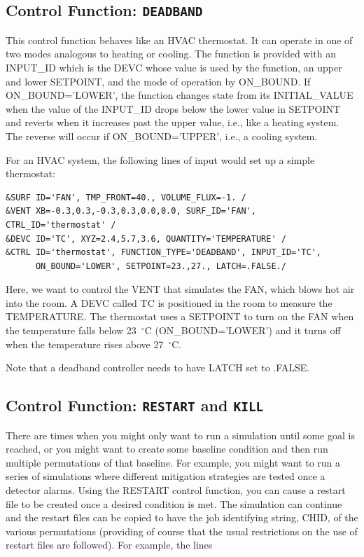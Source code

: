 \documentclass[11pt]{book}
\begin{document}
\subsection{Control Function: \texorpdfstring{{\tt DEADBAND}}{DEADBAND}}
\label{info:DEADBAND}

This control function behaves like an HVAC thermostat.  It can operate in one of two modes analogous to heating or cooling.
The function is provided with an {\ct INPUT\_ID} which is the {\ct DEVC} whose value is used by the function,
an upper and lower {\ct SETPOINT}, and the mode of operation by {\ct ON\_BOUND}.  If  {\ct ON\_BOUND='LOWER'},
the function changes state from its {\ct INITIAL\_VALUE} when the value of the {\ct INPUT\_ID} drops
below the lower value in {\ct SETPOINT} and reverts when it increases past the upper value, i.e., like a heating system.
The reverse will occur if {\ct ON\_BOUND='UPPER'}, i.e., a cooling system.

For an HVAC system, the following lines of input would set up a simple thermostat:

\begin{lstlisting}
&SURF ID='FAN', TMP_FRONT=40., VOLUME_FLUX=-1. /
&VENT XB=-0.3,0.3,-0.3,0.3,0.0,0.0, SURF_ID='FAN', CTRL_ID='thermostat' /
&DEVC ID='TC', XYZ=2.4,5.7,3.6, QUANTITY='TEMPERATURE' /
&CTRL ID='thermostat', FUNCTION_TYPE='DEADBAND', INPUT_ID='TC',
      ON_BOUND='LOWER', SETPOINT=23.,27., LATCH=.FALSE./
\end{lstlisting}

\noindent
Here, we want to control the {\ct VENT} that simulates the {\ct FAN}, which blows hot air
into the room. A {\ct DEVC} called {\ct TC} is positioned in the room to measure the {\ct TEMPERATURE}.
The {\ct thermostat} uses a {\ct SETPOINT} to turn on the
{\ct FAN} when the temperature falls below 23~$^\circ$C ({\ct ON\_BOUND='LOWER'})
and it turns off when the temperature rises above 27~$^\circ$C.


Note that a deadband controller needs to have {\ct LATCH} set to {\ct .FALSE.}


\subsection{Control Function: \texorpdfstring{{\tt RESTART} and {\tt KILL}} {RESTARTKILL} }

There are times when you might only want to run a simulation until some
goal is reached, or you might want to create some
baseline condition and then run multiple permutations of that baseline.
For example, you might want to run a series of simulations where
different mitigation strategies are tested once a detector alarms.
Using the {\ct RESTART}
control function, you can cause a restart file
to be created once a desired condition is met.  The simulation can
continue and the restart files can be copied to have the job identifying string, {\ct CHID}, of
the various permutations (providing of course that the usual
restrictions on the use of restart files are followed).
For example, the lines
\end{document}
